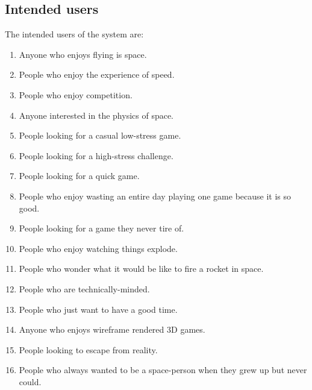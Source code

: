 \subsection{Intended users}

The intended users of the system are:

\begin{multicols}{2}
\begin{enumerate}

  \item Anyone who enjoys flying is space.

  \item People who enjoy the experience of speed.

  \item People who enjoy competition.

  \item Anyone interested in the physics of space.

  \item People looking for a casual low-stress game.

  \item People looking for a high-stress challenge.

  \item People looking for a quick game.

  \item People who enjoy wasting an entire day playing one game because it is so good.

  \item People looking for a game they never tire of.

  \item People who enjoy watching things explode.

  \item People who wonder what it would be like to fire a rocket in space.

  \item People who are technically-minded.

  \item People who just want to have a good time.

  \item Anyone who enjoys wireframe rendered 3D games.

  \item People looking to escape from reality.

  \item People who always wanted to be a space-person when they grew up but never could.


\end{enumerate}
\end{multicols}
